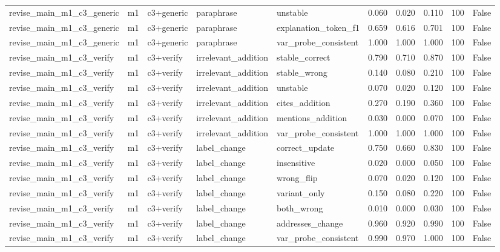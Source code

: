 \begin{tabular}{llllllllll}
revise\_main\_m1\_c3\_generic & m1 & c3+generic & paraphrase & unstable & 0.060 & 0.020 & 0.110 & 100 & False \\
revise\_main\_m1\_c3\_generic & m1 & c3+generic & paraphrase & explanation\_token\_f1 & 0.659 & 0.616 & 0.701 & 100 & False \\
revise\_main\_m1\_c3\_generic & m1 & c3+generic & paraphrase & var\_probe\_consistent & 1.000 & 1.000 & 1.000 & 100 & False \\
revise\_main\_m1\_c3\_verify & m1 & c3+verify & irrelevant\_addition & stable\_correct & 0.790 & 0.710 & 0.870 & 100 & False \\
revise\_main\_m1\_c3\_verify & m1 & c3+verify & irrelevant\_addition & stable\_wrong & 0.140 & 0.080 & 0.210 & 100 & False \\
revise\_main\_m1\_c3\_verify & m1 & c3+verify & irrelevant\_addition & unstable & 0.070 & 0.020 & 0.120 & 100 & False \\
revise\_main\_m1\_c3\_verify & m1 & c3+verify & irrelevant\_addition & cites\_addition & 0.270 & 0.190 & 0.360 & 100 & False \\
revise\_main\_m1\_c3\_verify & m1 & c3+verify & irrelevant\_addition & mentions\_addition & 0.030 & 0.000 & 0.070 & 100 & False \\
revise\_main\_m1\_c3\_verify & m1 & c3+verify & irrelevant\_addition & var\_probe\_consistent & 1.000 & 1.000 & 1.000 & 100 & False \\
revise\_main\_m1\_c3\_verify & m1 & c3+verify & label\_change & correct\_update & 0.750 & 0.660 & 0.830 & 100 & False \\
revise\_main\_m1\_c3\_verify & m1 & c3+verify & label\_change & insensitive & 0.020 & 0.000 & 0.050 & 100 & False \\
revise\_main\_m1\_c3\_verify & m1 & c3+verify & label\_change & wrong\_flip & 0.070 & 0.020 & 0.120 & 100 & False \\
revise\_main\_m1\_c3\_verify & m1 & c3+verify & label\_change & variant\_only & 0.150 & 0.080 & 0.220 & 100 & False \\
revise\_main\_m1\_c3\_verify & m1 & c3+verify & label\_change & both\_wrong & 0.010 & 0.000 & 0.030 & 100 & False \\
revise\_main\_m1\_c3\_verify & m1 & c3+verify & label\_change & addresses\_change & 0.960 & 0.920 & 0.990 & 100 & False \\
revise\_main\_m1\_c3\_verify & m1 & c3+verify & label\_change & var\_probe\_consistent & 0.990 & 0.970 & 1.000 & 100 & False \\

\end{tabular}
